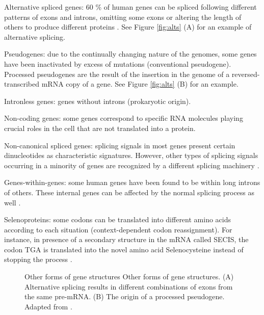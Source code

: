 \begin{mitemize}
\item
Alternative spliced genes:  
60 \% of human genes can be spliced following different
patterns of exons and introns, omitting some exons or altering the length of 
others to produce different proteins \citep{ladd:2002a}. See Figure \ref{fig:alts} (A) for an 
example of alternative splicing.
\item
Pseudogenes: 
due to the continually changing nature of the genomes, some
genes have been inactivated by excess of mutations (conventional pseudogene).
Processed pseudogenes are the result of the insertion in the genome
of a reversed-transcribed mRNA copy of a gene. See Figure \ref{fig:alts} (B) for an example.
\item
Intronless genes:  
genes without introns (prokaryotic origin).
\item
Non-coding genes: some genes correspond to specific RNA molecules playing
crucial roles in the cell that are not translated into a protein.
\item
Non-canonical spliced genes: 
splicing signals in most genes present certain
dinucleotides as characteristic signatures. However, other types of splicing
signals occurring in a minority of genes are recognized by a different splicing
machinery \citep{burset:2000a}.
\item
Genes-within-genes: some human genes have been found to be within long
introns of others. These internal genes can be affected by the normal splicing 
process as well \citep{brown:1999a}.
\item
Selenoproteins:  
some codons can be translated into different amino acids
according to each situation (context-dependent codon reassignment). For instance, 
in presence of a secondary structure in the mRNA called SECIS, the codon TGA is 
translated into the novel amino acid Selenocysteine instead of stopping the process 
\citep{low:1996a}.
\end{mitemize}

\begin{figure}[t!]
\begin{center}
\setlength{\fboxsep}{0pt}
          {Other forms of gene structures}%
          {Other forms of gene structures.}%
          {(A) Alternative splicing results in different combinations of exons
from the same pre-mRNA. (B) The origin of a processed pseudogene. Adapted from \citet{brown:1999a}.}
\end{center}
\end{figure}

